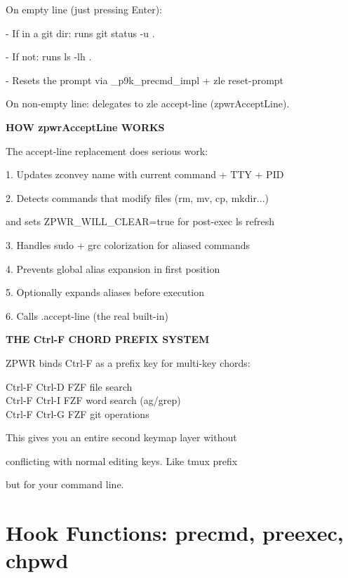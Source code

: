 \documentclass[11pt,a4paper,twoside]{book}
\begin{document}
On empty line (just pressing Enter):

\begin{codebox}
- If in a git dir: runs git status -u .\\
\end{codebox}

- If not: runs ls -lh .

- Resets the prompt via \_p9k\_precmd\_impl + zle reset-prompt

On non-empty line: delegates to zle accept-line (zpwrAcceptLine).


\vspace{12pt}
{\bfseries\color{neonyellow} HOW zpwrAcceptLine WORKS}\vspace{4pt}

The accept-line replacement does serious work:

1. Updates zconvey name with current command + TTY + PID

2. Detects commands that modify files (rm, mv, cp, mkdir...)

and sets ZPWR\_WILL\_CLEAR=true for post-exec ls refresh

3. Handles sudo + grc colorization for aliased commands

4. Prevents global alias expansion in first position

5. Optionally expands aliases before execution

6. Calls .accept-line (the real built-in)


\vspace{12pt}
{\bfseries\color{neonyellow} THE Ctrl-F CHORD PREFIX SYSTEM}\vspace{4pt}

ZPWR binds Ctrl-F as a prefix key for multi-key chords:

\begin{codebox}
Ctrl-F Ctrl-D   FZF file search\\
Ctrl-F Ctrl-I   FZF word search (ag/grep)\\
Ctrl-F Ctrl-G   FZF git operations\\
\end{codebox}

This gives you an entire second keymap layer without

conflicting with normal editing keys. Like tmux prefix

but for your command line.


\vspace{16pt}

\section{Hook Functions: precmd, preexec, chpwd}
\end{document}
